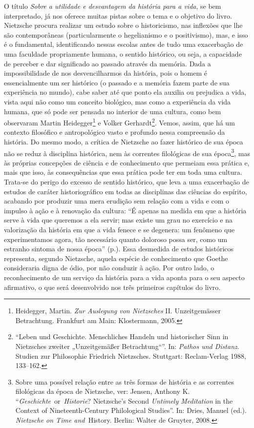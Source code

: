 O título \emph{Sobre a utilidade e desvantagem da história para a vida},
se bem interpretado, já nos oferece muitas pistas sobre o tema e o
objetivo do livro. Nietzsche procura realizar um estudo sobre o
historicismo, nas inflexões que lhe são contemporâneas (particularmente
o hegelianismo e o positivismo), mas, e isso é o fundamental,
identificando nessas escolas antes de tudo uma exacerbação de uma
faculdade propriamente humana, o sentido histórico, ou seja, a
capacidade de perceber e dar significado ao passado através da memória.
Dada a impossibilidade de nos desvencilharmos da história, pois o homem
é essencialmente um ser histórico (o passado e a memória fazem parte de
sua experiência no mundo), cabe saber até que ponto ela auxilia ou
prejudica a vida, vista aqui não como um conceito biológico, mas como a
experiência da vida humana, que só pode ser pensada no interior de uma
cultura, como bem observaram Martin Heidegger\footnote{
  Heidegger, Martin. \emph{Zur Auslegung von Nietzsches} II.
  Unzeitgemässer Betrachtung. Frankfurt am Main: Klostermann,
  2005.}
e Volker Gerhardt\footnote{``Leben und Geschichte. Menschliches Handeln
  und historischer Sinn in Nietzsches zweiter „Unzeitgemäßer
  Betrachtung``''. In: \emph{Pathos und Distanz}. Studien zur
  Philosophie Friedrich Nietzsches. Stuttgart: Reclam-Verlag 1988,
  133--162.}. Vemos, assim, que há um contexto filosófico e
antropológico vasto e profundo nessa compreensão da história. Do mesmo
modo, a crítica de Nietzsche ao fazer histórico de sua época não se
reduz à disciplina histórica, nem às correntes filológicas de sua
época\footnote{Sobre uma possível relação entre as três formas de
  história e as correntes filológicas da época de Nietzsche, ver:
  Jensen, Anthony K. ``\emph{Geschichte}~or~\emph{Historie}? Nietzsche's
  Second \emph{Untimely Meditation} in the Context of Nineteenth-Century
  Philological Studies''. In: Dries, Manuel (ed.). \emph{Nietzsche on
  Time and~}History. Berlin: Walter de Gruyter, 2008.}, mas às próprias
concepções de ciência e de conhecimento que permeiam essa prática e,
mais que isso, às consequências que essa prática pode ter em toda uma
cultura. Trata-se do perigo do excesso de sentido histórico, que leva a
uma exacerbação de estudos de caráter historiográfico em todas as
disciplinas das ciências do espírito, acabando por produzir uma mera
erudição sem relação com a vida e com o impulso à ação e à renovação da
cultura: ``É apenas na medida em que a história serve à vida que
queremos a ela servir; mas existe um grau no exercício e na valorização
da história em que a vida fenece e se degenera: um fenômeno que
experimentamos agora, tão necessário quanto doloroso possa ser, como um
estranho sintoma de nossa época'' (p.). Essa desmedida de estudos
históricos representa, segundo Nietzsche, aquela espécie de conhecimento
que Goethe consideraria digna de ódio, por não conduzir à ação. Por
outro lado, o reconhecimento de um serviço da história para a vida
aponta para o seu aspecto afirmativo, o que será desenvolvido nos três
primeiros capítulos do livro.

